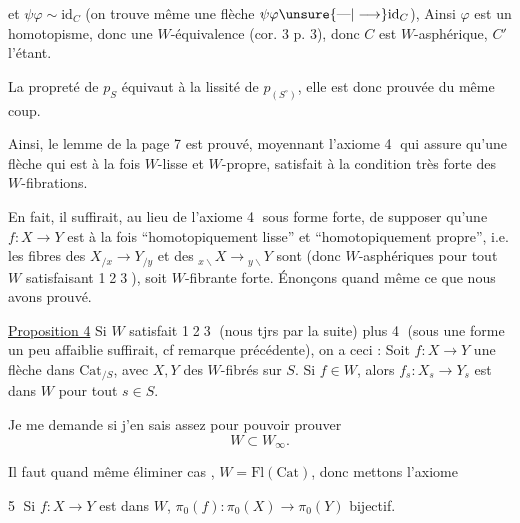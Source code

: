 
et $\psi\varphi\sim\mathrm{id}_C$ (on trouve même une flèche $\psi\varphi\unsure{\text{---}|\longrightarrow}\mathrm{id}_C$), Ainsi $\varphi$ est un homotopisme, donc une $W$-équivalence (cor. 3 p. 3), donc $C$ est $W$-asphérique, $C'$ l'étant.

La propreté de $p_S$ équivaut à la lissité de $p_{(S^\circ)}$, elle est donc prouvée du même coup.

Ainsi, le lemme de la page 7 est prouvé, moyennant l'axiome \textcircled{4} qui assure qu'une flèche qui est à la fois $W$-lisse et $W$-propre, satisfait à la condition très forte  des $W$-fibrations.


En fait, il suffirait, au lieu de l'axiome \textcircled{4} sous  forme forte, de supposer qu'une $f:X\longrightarrow Y$  est à la fois ``homotopiquement lisse'' et ``homotopiquement propre'', i.e. les fibres des $X_{/x}\longrightarrow Y_{/y}$ et des $ {}_{x\backslash}X\longrightarrow{}_{y\backslash}Y$ sont  (donc $W$-asphériques pour tout $W$ satisfaisant \textcircled{1}\textcircled{2}\textcircled{3}), soit $W$-fibrante forte. Énonçons quand même ce que nous avons prouvé.


\uline{Proposition 4} Si $W$ satisfait \textcircled{1}\textcircled{2}\textcircled{3} (nous  tjrs par la suite) plus \textcircled{4} (sous une forme un peu affaiblie suffirait, cf remarque précédente), on a ceci : Soit $f:X\longrightarrow Y$ une flèche dans $\mathrm{Cat}_{/S}$, avec $X,Y$ des $W$-fibrés sur $S$.  Si $f\in W$, alors $f_s:X_s\longrightarrow Y_s$ est dans $W$ pour tout $s\in S$.

Je me demande si j'en sais assez pour pouvoir prouver
\[
W\subset W_\infty.
\]

Il faut quand même éliminer  cas ,  $W=\mathrm{Fl}(\mathrm{Cat})$, donc mettons l'axiome


\textcircled{5} Si $f:X\longrightarrow Y$ est dans $W$, $\pi_0(f):\pi_0(X)\longrightarrow\pi_0(Y)$ bijectif.



